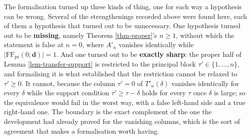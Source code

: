 \documentclass[11pt, a4paper, abstract=yes]{scrartcl}
\theoremstyle{definition}
\theoremstyle{remark}
\theoremstyle{plain}
\newcommand{\vek}[1]{\boldsymbol{#1}}
\begin{document}
\begin{itemize}
The formalisation turned up three kinds of thing, one for each way a hypothesis can be wrong.
Several of the strengthenings recorded above were found here, each of them a hypothesis that
turned out to be unnecessary. One hypothesis turned out to be \textbf{missing}, namely
Theorem \ref{thm-proper}'s \(n\ge1\), without which the statement is false at \(n=0\), where
\(A'_n\) vanishes identically while
\(\lvert\mathrm{FF}_{\mathrm{pr}}(0;\vek d)\rvert=1\). And one turned out to be \textbf{exactly
sharp}: the proper half of Lemma \ref{lem-transfer-support} is restricted to the principal block
\(\tau'\in\lbrace1,\dots,n\rbrace\), and formalising it is what established that the
restriction cannot be relaxed to \(\tau'\ge0\). It cannot, because the column \(\tau'=0\) of
\(T'_n(\delta)\) vanishes identically for every \(\delta\) while the support condition
\(\tau'\ge\tau-\delta\) holds for every \(\tau\) once \(\delta\) is large; so the
equivalence would fail in the worst way, with a false left-hand side and a true right-hand one.
The boundary is the exact complement of the one the development had already proved for the
vanishing columns, which is the sort of agreement that makes a formalisation worth having.


\end{itemize}
\end{document}
